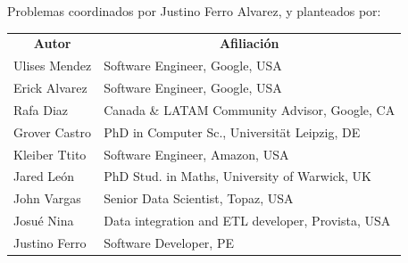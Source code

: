\documentclass[11pt,a4paper,oneside]{article}
\begin{document}
\begin{center}

\vspace{1cm}

Problemas coordinados por Justino Ferro Alvarez, y planteados por:

\vspace{0.3cm}

\begin{tabular}{ l l }
\multicolumn{1}{c}{\textbf{Autor}} & \multicolumn{1}{c}{\textbf{Afiliación}} \\
Ulises Mendez& Software Engineer, Google, USA \\
Erick Alvarez& Software Engineer, Google, USA \\
Rafa Diaz& Canada \& LATAM Community Advisor, Google, CA \\
Grover Castro & PhD in Computer Sc., Universität Leipzig, DE\\
Kleiber Ttito& Software Engineer, Amazon, USA \\
Jared León & PhD Stud. in Maths, University of Warwick, UK\\
John Vargas & Senior Data Scientist, Topaz, USA\\
Josué Nina & Data integration and ETL developer, Provista, USA\\
Justino Ferro & Software Developer, PE\\
\end{tabular}

\end{center}

\newpage


\iftoggle{solution}{}{}%

\iftoggle{solution}{}{}%

\iftoggle{solution}{}{}%

\iftoggle{solution}{}{}%

\iftoggle{solution}{}{}%

\iftoggle{solution}{}{}%

\iftoggle{solution}{}{}%

\iftoggle{solution}{}{}%

\iftoggle{solution}{}{}%

\iftoggle{solution}{}{}%

\iftoggle{solution}{}{}%

\iftoggle{solution}{}{}%

\iftoggle{solution}{}{}%

\iftoggle{solution}{}{}%
\end{document}
